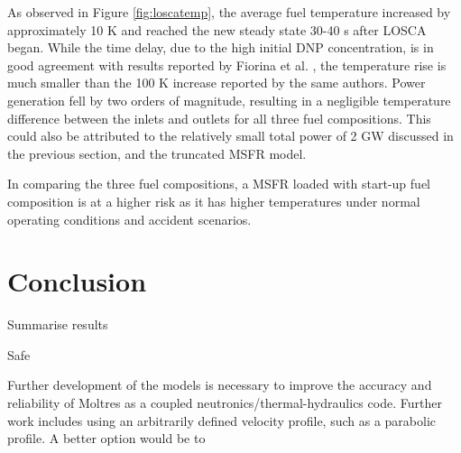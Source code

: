 \documentclass{anstrans}
\begin{document}
	As observed in Figure \ref{fig:loscatemp}, the average fuel temperature
	increased by approximately 10 K and reached the new steady state
	30-40 s after \gls{LOSCA} began. While the time delay, due to the high
	initial
	\gls{DNP} concentration, is in good agreement with results reported by
	Fiorina et al. \cite{fiorina_modelling_2014}, the temperature rise is much
	smaller than the 100 K increase reported by the same authors.
	Power generation fell by two orders of
	magnitude, resulting in a negligible temperature difference between the
	inlets and outlets for all three fuel compositions. This could also be
	attributed to the relatively small total power of 2 GW discussed in the
	previous section, and the truncated \gls{MSFR} model.
	
	In comparing the three fuel compositions, a \gls{MSFR} loaded with
	start-up fuel composition is at a higher risk as it has higher
	temperatures under normal operating conditions and accident scenarios.

\section{Conclusion}

	Summarise results
	
	Safe
	
	Further development of the models is necessary to improve the accuracy
	and reliability of Moltres as a coupled neutronics/thermal-hydraulics code.
	Further work includes using an arbitrarily defined velocity profile, such
	as a parabolic profile. A better option would be to 



\end{document}
